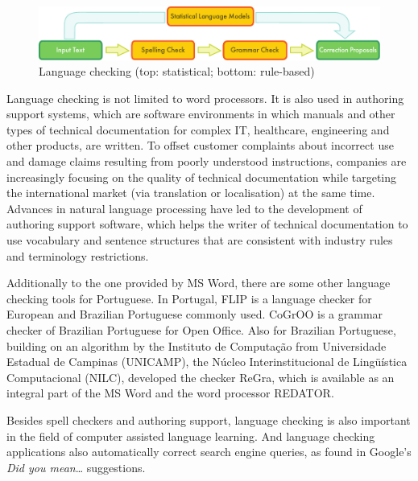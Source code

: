\begin{multicols}{2}
\begin{figure}[htb]
  \center
  \includegraphics[width=\textwidth]{../_media/english/language_checking}
  \caption{Language checking (top: statistical; bottom: rule-based)}
  \label{fig:langcheckingaarch_en}
\end{figure}


Language checking is not limited to word processors. It is also used in authoring support systems, which are software environments in which manuals and other types of technical documentation for complex IT, healthcare, engineering and other products, are written. To offset customer complaints about incorrect use and damage claims resulting from poorly understood instructions, companies are increasingly focusing on the quality of technical documentation while targeting the international market (via translation or localisation) at the same time. Advances in natural language processing have led to the development of authoring support software, which helps the writer of technical documentation to use vocabulary and sentence structures that are consistent with industry rules and terminology restrictions.


Additionally to the one provided by MS Word, there are some other language checking tools for Portuguese. 
In Portugal, FLIP is a language checker for European and Brazilian Portuguese commonly used. 
CoGrOO is a grammar checker of Brazilian Portuguese for Open Office. Also for Brazilian Portuguese, 
building on an algorithm by the Instituto de Computação from Universidade Estadual de Campinas (UNICAMP), 
the Núcleo Interinstitucional de Lingüística Computacional (NILC), 
developed the checker ReGra, which is available as an integral part of the MS Word and the word processor REDATOR. 

Besides spell checkers and authoring support, language checking is also important in the field of computer assisted language learning. And language checking applications also automatically correct search engine queries, as found in Google's \textit{Did you mean}… suggestions.




\end{multicols}
